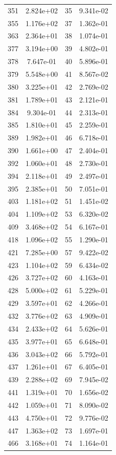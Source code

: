 \documentclass[12pt]{article}
\begin{document}
\begin{longtable}{@{}cccc@{}}
351 & 2.824e+02 & 35 & 9.341e-02 \\
355 & 1.176e+02 & 37 & 1.362e-01 \\
363 & 2.364e+01 & 38 & 1.074e-01 \\
377 & 3.194e+00 & 39 & 4.802e-01 \\
378 & 7.647e-01 & 40 & 5.896e-01 \\
379 & 5.548e+00 & 41 & 8.567e-02 \\
380 & 3.225e+01 & 42 & 2.769e-02 \\
381 & 1.789e+01 & 43 & 2.121e-01 \\
384 & 9.304e-01 & 44 & 2.313e-01 \\
385 & 1.810e+01 & 45 & 2.259e-01 \\
389 & 1.982e+01 & 46 & 6.718e-01 \\
390 & 1.661e+00 & 47 & 2.404e-01 \\
392 & 1.060e+01 & 48 & 2.730e-01 \\
394 & 2.118e+01 & 49 & 2.497e-01 \\
395 & 2.385e+01 & 50 & 7.051e-01 \\
403 & 1.181e+02 & 51 & 1.451e-02 \\
404 & 1.109e+02 & 53 & 6.320e-02 \\
409 & 3.468e+02 & 54 & 6.167e-01 \\
418 & 1.096e+02 & 55 & 1.290e-01 \\
421 & 7.285e+00 & 57 & 9.422e-02 \\
423 & 1.104e+02 & 59 & 6.434e-02 \\
426 & 3.727e+02 & 60 & 4.163e-01 \\
428 & 5.000e+02 & 61 & 5.229e-01 \\
429 & 3.597e+01 & 62 & 4.266e-01 \\
432 & 3.776e+02 & 63 & 4.909e-01 \\
434 & 2.433e+02 & 64 & 5.626e-01 \\
435 & 3.977e+01 & 65 & 6.648e-01 \\
436 & 3.043e+02 & 66 & 5.792e-01 \\
437 & 1.261e+01 & 67 & 6.405e-01 \\
439 & 2.288e+02 & 69 & 7.945e-02 \\
441 & 1.319e+01 & 70 & 1.656e-02 \\
442 & 1.059e+01 & 71 & 8.090e-02 \\
443 & 4.750e+01 & 72 & 9.776e-02 \\
447 & 1.363e+02 & 73 & 1.697e-01 \\
466 & 3.168e+01 & 74 & 1.164e-01 \\

\end{longtable}
\end{document}
